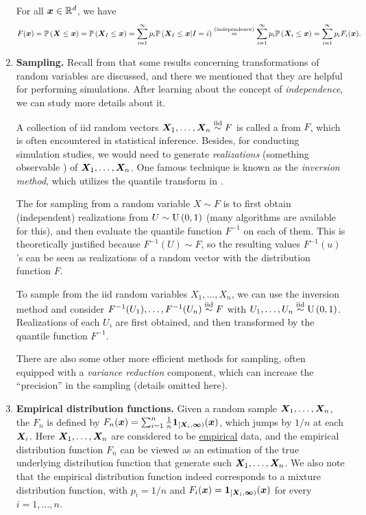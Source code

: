 \begin{enumerate}
\begin{pf}
For all \(\bm{x}\in\mathbb{R}^d\), we have
\[
F(\bm{x})=\mathbb{P}\left(\bm{X}\le\bm{x}\right)
=\mathbb{P}\left(\bm{X}_{I}\le\bm{x}\right)
=\sum_{i=1}^{\infty}p_i\mathbb{P}\left(\bm{X}_{I}\le\bm{x}|I=i\right)
\overset{\text{(independence)}}{=}\sum_{i=1}^{\infty}p_i\mathbb{P}\left(\bm{X}_i\le\bm{x}\right)
=\sum_{i=1}^{\infty}p_iF_i(\bm{x}).
\]
\end{pf}
\item \label{it:sampling} \textbf{Sampling.} Recall from
 that some results concerning transformations of
random variables are discussed, and there we mentioned that they are helpful
for performing simulations. After learning about the concept of
\emph{independence}, we can study more details about it.

A collection of iid random vectors \(\bm{X}_1,\dotsc,\bm{X}_n\overset{\text{iid}}\sim F\) is called a
 from \(F\), which is often encountered in statistical
inference. Besides, for conducting simulation studies, we would need to
generate \emph{realizations} (something observable ) of
\(\bm{X}_1,\dotsc,\bm{X}_n\). One famous technique is known as the \emph{inversion
method}, which utilizes the quantile transform in .

The  for sampling from a random variable \(X\sim F\) is
to first obtain (independent) realizations from \(U\sim \operatorname{U}\left(0,1\right)\) (many
algorithms are available for this), and then evaluate the quantile function
\(F^{-1}\) on each of them. This is theoretically justified because \(F^{-1}(U)\sim F\),
so the resulting values \(F^{-1}(u)\)'s can be seen as realizations of a
random vector with the distribution function \(F\).

To sample from the iid random variables \(X_1,\dotsc,X_n\), we can use the
inversion method and consider \(F^{-1}(U_1),\dotsc,F^{-1}(U_n)\overset{\text{iid}}\sim F\) with
\(U_1,\dotsc,U_n\overset{\text{iid}}\sim \operatorname{U}\left(0,1\right)\). Realizations of each \(U_i\) are first
obtained, and then transformed by the quantile function \(F^{-1}\).

\begin{note}
There are also some other more efficient methods for sampling, often equipped
with a \emph{variance reduction} component, which can increase the ``precision'' in
the sampling (details omitted here).
\end{note}
\item \textbf{Empirical distribution functions.} Given a random sample
\(\bm{X}_1,\dotsc,\bm{X}_n\), the  \(F_n\) is defined by
\(F_n(\bm{x})=\sum_{i=1}^{n}\frac{1}{n}\mathbf{1}_{[\bm{X}_i,\bm{\infty})}(\bm{x})\),
which jumps by \(1/n\) at each \(\bm{X}_i\). Here
\(\bm{X}_1,\dotsc,\bm{X}_n\) are considered to be \underline{empirical} data,
and the empirical distribution function \(F_n\) can be viewed as an
estimation of the true underlying distribution function that generate such
\(\bm{X}_1,\dotsc,\bm{X}_n\). We also note that the empirical distribution
function indeed corresponds to a mixture distribution function, with
\(p_i=1/n\) and \(F_i(\bm{x})=\mathbf{1}_{[\bm{X}_i,\bm{\infty})}(\bm{x})\)
for every \(i=1,\dotsc,n\).


\end{enumerate}
